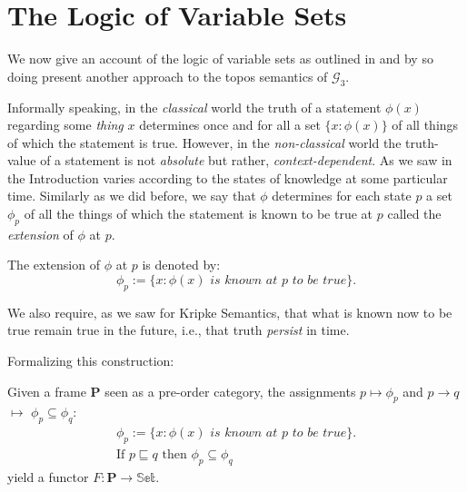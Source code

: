 

\section{The Logic of Variable Sets}
We now give an account of the logic of variable sets as outlined in \cite{goldblatt} and by so doing present another approach to the topos semantics of $\mathcal{G}_3$.   \newline\newline


Informally speaking, in the \emph{classical} world the truth of a statement $\phi(x)$ regarding some \emph{thing} $x$ determines once and for all a set $\{x: \phi(x)\}$ of all things of which the statement is true. \newline
However, in the \emph{non-classical} world the truth-value of a statement is not \emph{absolute} but rather, \emph{context-dependent}. \newline As we saw in the Introduction varies according to the states of knowledge at some particular time. Similarly as we did before, we say that $\phi$ determines for each state $p$ a set $\phi_p$ of all the things of which the statement is known to be true at $p$ called the \emph{extension} of $\phi$ at $p$. 

\begin{definition}[$\phi_p$]
	The extension of $\phi$ at $p$ is denoted by: \begin{equation*}
		\phi_p := \{x: \phi(x)\textit{ is known at p to be true}\}.
	\end{equation*}
\end{definition}

We also require, as we saw for Kripke Semantics, that what is known now to be true remain true in the future, i.e., that truth \emph{persist} in time. 

Formalizing this construction:

\begin{definition}
	Given a frame \textbf{P} seen as a pre-order category, the assignments $p \mapsto \phi_p$ and $p \rightarrow q $ $\mapsto$ $\phi_p \subseteq \phi_q$: 
	\begin{gather*}
		\phi_p := \{x: \phi(x)\textit{ is known at p to be true}\}. \\
		\text{If } p \sqsubseteq q \text{ then } \phi_p \subseteq \phi_q
	\end{gather*}
	yield a functor $F : \textbf{P} \rightarrow \mathbb{Set}$.
\end{definition}

